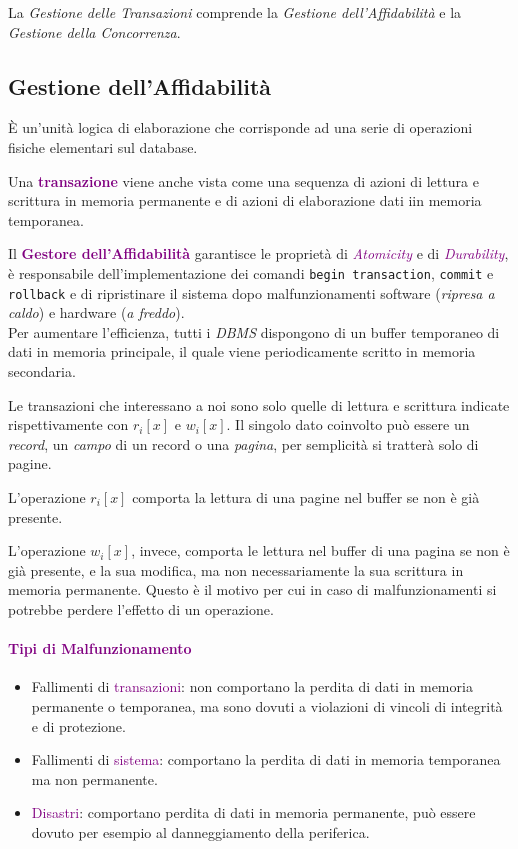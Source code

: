 La \emph{Gestione delle Transazioni} comprende la \emph{Gestione dell'Affidabilità} e
la \emph{Gestione della Concorrenza}.

\subsection{Gestione dell'Affidabilità}

\begin{definition}[Transazione]
    È un'unità logica di elaborazione che corrisponde ad una serie
    di operazioni fisiche elementari sul database.

    Una \textbf{\textcolor{purple}{transazione}} viene anche vista come una sequenza di azioni
    di lettura e scrittura in memoria permanente e di azioni di elaborazione dati iin memoria temporanea.
\end{definition}

Il \textbf{\textcolor{purple}{Gestore dell'Affidabilità}} garantisce le proprietà di
\emph{\textcolor{purple}{Atomicity}} e di \emph{\textcolor{purple}{Durability}}, è
responsabile dell'implementazione dei comandi \verb|begin transaction|, \verb|commit| e
\verb|rollback| e di ripristinare il sistema dopo malfunzionamenti software (\emph{ripresa a caldo})
e hardware (\emph{a freddo}). \\

Per aumentare l'efficienza, tutti i \emph{DBMS} dispongono di un buffer
temporaneo di dati in memoria principale, il quale viene periodicamente scritto
in memoria secondaria.

Le transazioni che interessano a noi sono solo quelle di lettura e scrittura
indicate rispettivamente con $r_i[x]$ e $w_i[x]$. Il singolo dato coinvolto può
essere un \emph{record}, un \emph{campo} di un record o una \emph{pagina}, per semplicità
si tratterà solo di pagine.

L'operazione $r_i[x]$ comporta la lettura di una pagine nel buffer se non è già presente.

L'operazione $w_i[x]$, invece, comporta le lettura nel buffer di una pagina se non è
già presente, e la sua modifica, ma non necessariamente la sua scrittura in memoria permanente.
Questo è il motivo per cui in caso di malfunzionamenti si potrebbe perdere l'effetto
di un operazione.

\paragraph{\textcolor{purple}{Tipi di Malfunzionamento}}
\begin{itemize}
    \item Fallimenti di \textcolor{purple}{transazioni}: non comportano la perdita di dati
        in memoria permanente o temporanea, ma sono dovuti a violazioni di vincoli di integrità e
        di protezione.
    \item Fallimenti di \textcolor{purple}{sistema}: comportano la perdita di dati in memoria
        temporanea ma non permanente.
    \item \textcolor{purple}{Disastri}: comportano perdita di dati in memoria permanente, può
        essere dovuto per esempio al danneggiamento della periferica.
\end{itemize}